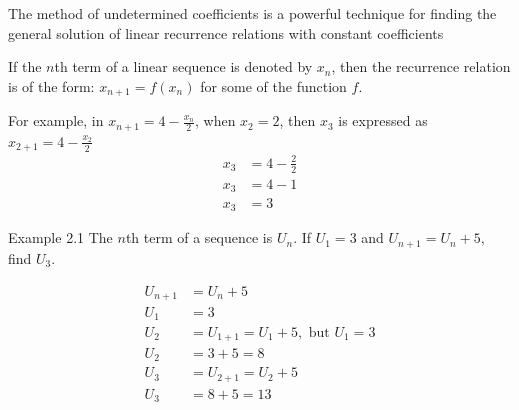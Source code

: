 The method of undetermined coefficients is a powerful technique for finding the
general solution of linear recurrence relations with constant coefficients

If the $n$th term of a linear sequence is denoted by $x_n$, then the recurrence relation
is of the form: $x_{n+1} = f(x_n)$ for some of the function $f$.

For example, in $x_{n+1} = 4 - \frac{x_n}{2}$, when $x_2 = 2$, then $x_3$ is expressed as
$x_{2+1} = 4 - \frac{x_2}{2}$
\begin{align*}
  x_3 &= 4 - \frac{2}{2} \\
  x_3 &= 4 - 1 \\
  x_3 &= 3
\end{align*}

\begin{example}{Example 2.1}
The $n$th term of a sequence is $U_n$. If $U_1 = 3$ and $U_{n+1} = U_n + 5$, find $U_3$.

\solution
\begin{align*}
  U_{n+1} &= U_n + 5 \\
  U_1 &= 3 \\
  U_2 &= U_{1+1} = U_1 + 5, \text{ but } U_1 = 3 \\
  U_2 &= 3 + 5 = 8 \\
  U_3 &= U_{2+1} = U_2 + 5 \\
  U_3 &= 8 + 5 = 13
\end{align*}
\end{example}
